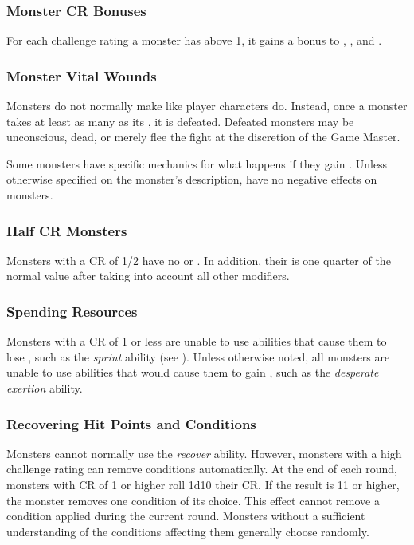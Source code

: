         \subsubsection{Monster CR Bonuses}
            For each challenge rating a monster has above 1, it gains a  bonus to , , and .

        \subsubsection{Monster Vital Wounds}
            Monsters do not normally make  like player characters do.
            Instead, once a monster takes at least as many  as its , it is defeated.
            Defeated monsters may be unconscious, dead, or merely flee the fight at the discretion of the Game Master.

            Some monsters have specific mechanics for what happens if they gain .
            Unless otherwise specified on the monster's description,  have no negative effects on monsters.

        \subsubsection{Half CR Monsters}\label{Half CR Monsters}
            Monsters with a CR of 1/2 have no  or .
            In addition, their  is one quarter of the normal value after taking into account all other modifiers.

        \subsubsection{Spending Resources}
            Monsters with a CR of 1 or less are unable to use abilities that cause them to lose , such as the \textit{sprint} ability (see ).
            Unless otherwise noted, all monsters are unable to use abilities that would cause them to gain , such as the \textit{desperate exertion} ability.

        \subsubsection{Recovering Hit Points and Conditions}
            Monsters cannot normally use the \textit{recover} ability.
            However, monsters with a high challenge rating can remove conditions automatically.
            At the end of each round, monsters with CR of 1 or higher roll 1d10 \add their CR.
            If the result is 11 or higher, the monster removes one condition of its choice.
            This effect cannot remove a condition applied during the current round.
            Monsters without a sufficient understanding of the conditions affecting them generally choose randomly.

